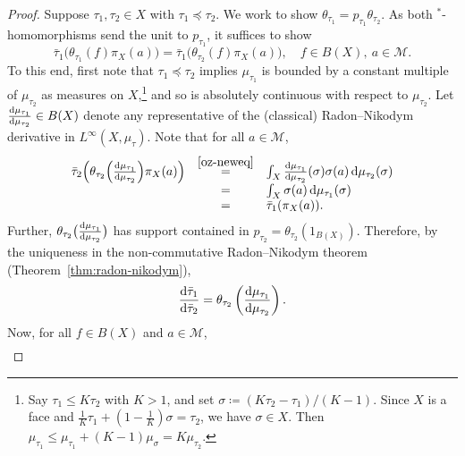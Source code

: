 \documentclass[a4paper,11pt]{amsart}
\theoremstyle{definition}
\numberwithin{equation}{section}
\numberwithin{theorem}{section}
\begin{document}
\begin{proof}
    Suppose $\tau_1, \tau_2 \in X$ with $\tau_1 \preceq \tau_2$.  We work to show $\theta_{\tau_1} = p_{\tau_1} \theta_{\tau_2}$.  As both $^*$-homomorphisms send the unit to $p_{\tau_1}$, it suffices to show 
    \begin{equation}\label{oz-neweq3}
        \bar\tau_1\big(\theta_{\tau_1}(f)\pi_X(a)\big) = \bar\tau_1\big(\theta_{\tau_2}(f)\pi_X(a)\big), \quad f \in B(X),\ a \in \mathcal M.
    \end{equation}
    To this end, first note that $\tau_1 \preceq \tau_2$ implies $\mu_{\tau_1}$ is bounded by a constant multiple of $\mu_{\tau_2}$ as measures on $X$,\footnote{Say $\tau_1\leq K\tau_2$ with $K>1$, and set $\sigma\coloneqq (K\tau_2-\tau_1)/(K-1)$. Since $X$ is a face and $\tfrac{1}{K}\tau_1 + \left(1-\tfrac{1}{K}\right)\sigma = \tau_2$, we have $\sigma \in X$. Then $\mu_{\tau_1} \leq \mu_{\tau_1} + (K-1)\mu_\sigma = K\mu_{\tau_2}$.} and so is absolutely continuous with respect to $\mu_{\tau_2}$. Let $\frac{{\rm d} \mu_{\tau_1}}{{\rm d} \mu_{\tau_2}} \in B(X)$ denote any representative of the (classical) Radon--Nikodym derivative in $L^\infty(X, \mu_\tau)$.  Note that for all $a \in \mathcal M$,
    \begin{equation}\label{oz-compatible}
    \begin{array}{rcl}
        \bar\tau_2\Big(\theta_{\tau_2}\Big(\frac{{\rm d} \mu_{\tau_1}}{{\rm d} \mu_{\tau_2}}\Big)\pi_X(a)\Big) &\stackrel{\eqref{oz-neweq}}=& 
        \int_X \frac{{\rm d} \mu_{\tau_1}}{{\rm d} \mu_{\tau_2}}(\sigma) \sigma(a) \,{\rm d}\mu_{\tau_2}(\sigma)\\
        &=& \int_X \sigma(a) \,{\rm d} \mu_{\tau_1}(\sigma) \\
        &=& \bar\tau_1(\pi_X(a)).
    \end{array}
    \end{equation}
    Further, $\theta_{\tau_2}\big(\frac{{\rm d} \mu_{\tau_1}}{{\rm d} \mu_{\tau_2}}\big)$ has support contained in $p_{\tau_2} = \theta_{\tau_2}(1_{B(X)})$.
    Therefore, by the uniqueness in the non-commutative Radon--Nikodym theorem (Theorem~\ref{thm:radon-nikodym}), 
\begin{equation}\label{oz-neweq2}
    \frac{{\rm d} \bar \tau_1}{{\rm d} \bar \tau_2} = \theta_{\tau_2}\left(\frac{{\rm d} \mu_{\tau_1}}{{\rm d} \mu_{\tau_2}}\right).
    \end{equation} 
    Now, for all $f \in B(X)$ and $a \in \mathcal M$,
    \begin{equation}
    \begin{array}{rcl}

\end{array}
\end{equation}
\end{proof}
\end{document}
